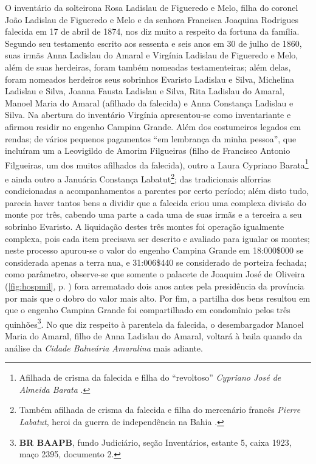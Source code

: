 O inventário da solteirona Rosa Ladislau de Figueredo e Melo, filha do coronel João Ladislau de Figueredo e Melo e da senhora Francisca Joaquina Rodrigues falecida em 17 de abril de 1874, nos diz muito a respeito da fortuna da família. Segundo seu testamento escrito aos sessenta e seis anos em 30 de julho de 1860, suas irmãs Anna Ladislau do Amaral e Virgínia Ladislau de Figueredo e Melo, além de suas herdeiras, foram também nomeadas testamenteiras; além delas, foram nomeados herdeiros seus sobrinhos Evaristo Ladislau e Silva, Michelina Ladislau e Silva, Joanna Fausta Ladislau e Silva, Rita Ladislau do Amaral, Manoel Maria do Amaral (afilhado da falecida) e Anna Constança Ladislau e Silva. Na abertura do inventário Virgínia apresentou-se como inventariante e afirmou residir no engenho Campina Grande. Além dos costumeiros legados em rendas; de vários pequenos pagamentos ``em lembrança da minha pessoa'', que incluíram um a Leovigildo de Amorim Filgueiras (filho de Francisco Antonio Filgueiras, um dos muitos afilhados da falecida), outro a Laura Cypriano Barata\footnote{Afilhada de crisma da falecida e filha do ``revoltoso'' \textit{Cypriano José de Almeida Barata} \cite{morel_barata_2001}.} e ainda outro a Januária Constança Labatut\footnote{Também afilhada de crisma da falecida e filha do mercenário francês \textit{Pierre Labatut}, heroi da guerra de independência na Bahia \cite{senado_anais_1851}.}; das tradicionais alforrias condicionadas a acompanhamentos a parentes por certo período; além disto tudo, parecia haver tantos bens a dividir que a falecida criou uma complexa divisão do monte por três, cabendo uma parte a cada uma de suas irmãs e a terceira a seu sobrinho Evaristo. A liquidação destes três montes foi operação igualmente complexa, pois cada item precisava ser descrito e avaliado para igualar os montes; neste processo apurou-se o valor do engenho Campina Grande em 18:000\$000 se considerada apenas a terra nua, e 31:006\$440 se considerado de porteira fechada; como parâmetro, observe-se que somente o palacete de Joaquim José de Oliveira (\autoref{fig:hospmil}, p. \pageref{fig:hospmil}) fora arrematado dois anos antes pela presidência da província por mais que o dobro do valor mais alto. Por fim, a partilha dos bens resultou em que o engenho Campina Grande foi compartilhado em condomĩnio pelos três quinhões\footnote{\textbf{BR BAAPB}, fundo Judiciário, seção Inventários, estante 5, caixa 1923, maço 2395, documento 2.}. No que diz respeito à parentela da falecida, o desembargador Manoel Maria do Amaral, filho de Anna Ladislau do Amaral, voltará à baila quando da análise da \textit{Cidade Balneária Amaralina} mais adiante.

